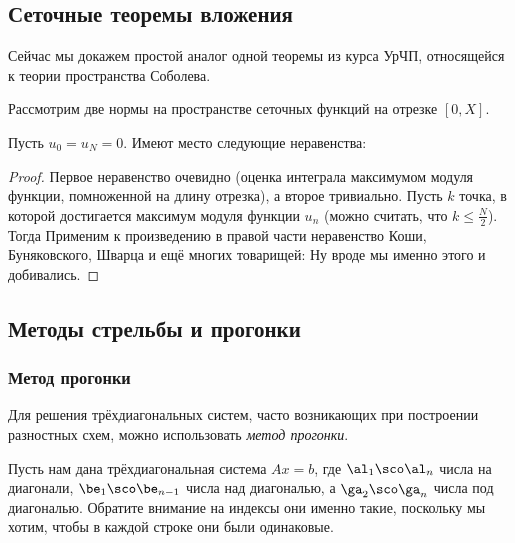 \documentclass[a4paper]{article}
\begin{document}
\subsection{Сеточные теоремы вложения}

Сейчас мы докажем простой аналог одной теоремы из курса УрЧП,
относящейся к теории пространства Соболева.

Рассмотрим две нормы на пространстве сеточных функций на отрезке
$[0,X]$.    

\begin{theorem}[вложения] Пусть $u_0 = u_N = 0$. Имеют место следующие неравенства:
 
\end{theorem}
\begin{proof}
Первое неравенство очевидно (оценка интеграла максимумом модуля
функции, помноженной на длину отрезка), а второе тривиально. Пусть $k$
точка, в которой достигается максимум модуля функции $u_n$ (можно
считать, что $k \le \frac N2$).  Тогда   Применим к произведению в правой
части неравенство Коши, Буняковского, Шварца и ещё многих товарищей:
  Ну вроде мы именно этого и добивались.
\end{proof}

\subsection{Методы стрельбы и прогонки}

\subsubsection{Метод прогонки}

Для решения трёхдиагональных систем, часто возникающих при построении
разностных схем, можно использовать \emph{метод прогонки}.

Пусть нам дана трёхдиагональная система $Ax=b$, где $\al_1\sco \al_n$
числа на диагонали, $\be_1\sco\be_{n-1}$ числа над диагональю, а
$\ga_2\sco\ga_{n}$ числа под диагональю. Обратите внимание на индексы
они именно такие, поскольку мы хотим, чтобы в каждой строке они были
одинаковые.
\end{document}

